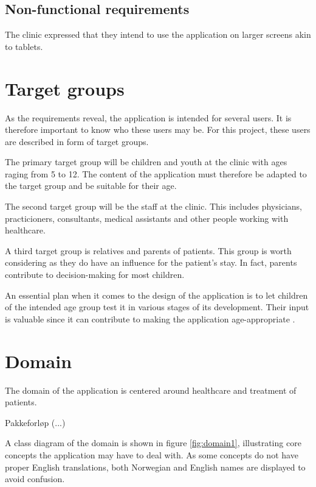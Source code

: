 \subsection{Non-functional requirements}

The clinic expressed that they intend to use the application on larger screens akin to tablets.

\section{Target groups}

As the requirements reveal, the application is intended for several users. It is therefore important to know who these users may be. For this project, these users are described in form of target groups.

The primary target group will be children and youth at the clinic with ages raging from 5 to 12. The content of the application must therefore be adapted to the target group and be suitable for their age.

The second target group will be the staff at the clinic. This includes physicians, practicioners, consultants, medical assistants and other people working with healthcare.

A third target group is relatives and parents of patients. This group is worth considering as they do have an influence for the patient's stay. In fact, parents contribute to decision-making for most children.

An essential plan when it comes to the design of the application is to let children of the intended age group test it in various stages of its development. Their input is valuable since it can contribute to making the application age-appropriate \parencite{stalberg2016}.

\section{Domain}

The domain of the application is centered around healthcare and treatment of patients.

Pakkeforløp (...)

A class diagram of the domain is shown in figure \ref{fig:domain1}, illustrating core concepts the application may have to deal with. As some concepts do not have proper English translations, both Norwegian and English names are displayed to avoid confusion.


